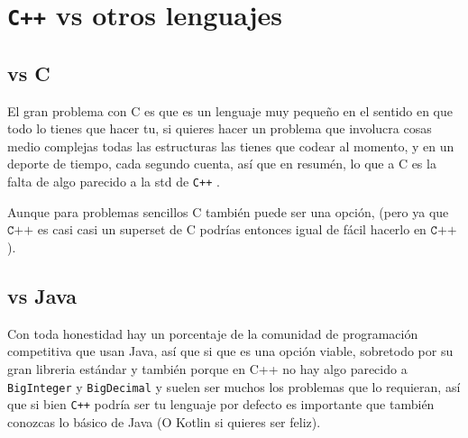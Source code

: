 \documentclass[12pt, fleqn]{report}                             %
\newcommand \Quote              {\qq}                           %
\theoremstyle{break}                                            %
\newcommand{\textCode}[1]  { \texttt{#1} }                      %
\newcommand \Cpp  {\textCode{C++} }                               %
\begin{document}
        \clearpage
        \section{\Cpp vs otros lenguajes}

            \subsection{vs C}

                El gran problema con C es que es un lenguaje muy pequeño en el sentido en que todo lo tienes que hacer tu,
                si quieres hacer un problema que involucra cosas medio complejas todas las estructuras las tienes que codear
                al momento, y en un deporte de tiempo, cada segundo cuenta, así que en resumén, lo que \Quote{mata} a C es la falta
                de algo parecido a la std de \Cpp.

                Aunque para problemas sencillos C también puede ser una opción, (pero ya que $\Cpp$ es casi casi
                un superset de C podrías entonces igual de fácil hacerlo en $\Cpp$).

            \subsection{vs Java}

                Con toda honestidad hay un porcentaje de la comunidad de programación competitiva que usan Java, así que
                si que es una opción viable, sobretodo por su gran libreria estándar y también porque en C++ no hay algo parecido
                a \textCode{BigInteger} y \textCode{BigDecimal} y suelen ser muchos los problemas que lo requieran, así que si bien \Cpp
                podría ser tu lenguaje por defecto es importante que también conozcas lo básico de Java (O Kotlin si quieres ser feliz).

\end{document}
